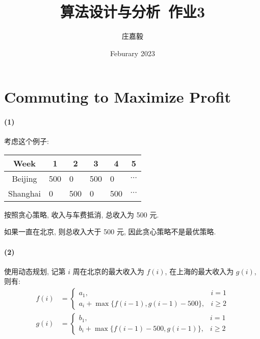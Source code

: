 \documentclass{ctexart}
\title{算法设计与分析~作业3}
\author{庄嘉毅}
\date{Feburary 2023}
\begin{document}
\maketitle

\section{Commuting to Maximize Profit}

\paragraph*{(1)} 考虑这个例子:

\begin{table}[H]
    \begin{tabular}{@{}clllll@{}}
        \toprule
        Week     & \multicolumn{1}{c}{1} & \multicolumn{1}{c}{2} & \multicolumn{1}{c}{3} & \multicolumn{1}{c}{4} & \multicolumn{1}{c}{5} \\ \midrule
        Beijing  & 500                   & 0                     & 500                   & 0                     & $\cdots$              \\ \midrule
        Shanghai & 0                     & 500                   & 0                     & 500                   & $\cdots$              \\ \bottomrule
    \end{tabular}
\end{table}

按照贪心策略, 收入与车费抵消, 总收入为 500 元.

如果一直在北京, 则总收入大于 500 元, 因此贪心策略不是最优策略.

\paragraph*{(2)} 使用动态规划, 记第 $i$ 周在北京的最大收入为 $f(i)$, 在上海的最大收入为 $g(i)$, 则有:
\begin{align*}
    f(i) & = \begin{cases}
                 a_1,                                & i = 1   \\
                 a_i + \max\{f(i-1), g(i-1) - 500\}, & i \ge 2
             \end{cases} \\
    g(i) & = \begin{cases}
                 b_1,                                & i = 1   \\
                 b_i + \max\{f(i-1) - 500, g(i-1)\}, & i \ge 2
             \end{cases}
\end{align*}
\end{document}
